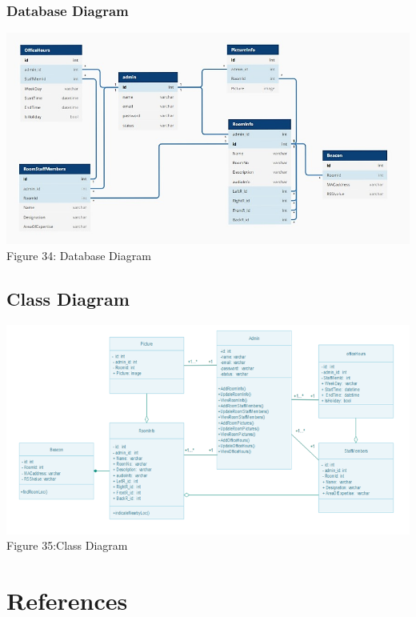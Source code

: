 \documentclass{article}
\begin{document}
\subsubsection{Database Diagram}
\begin{center}
\includegraphics[scale=0.6]{dbd}
\\Figure 34: Database Diagram
\end{center}
\subsection{Class Diagram}
\begin{center}
\includegraphics[scale=0.7]{cd}
\\Figure  35:Class Diagram
\end{center}
\pagebreak
\section{References}




\end{document}
